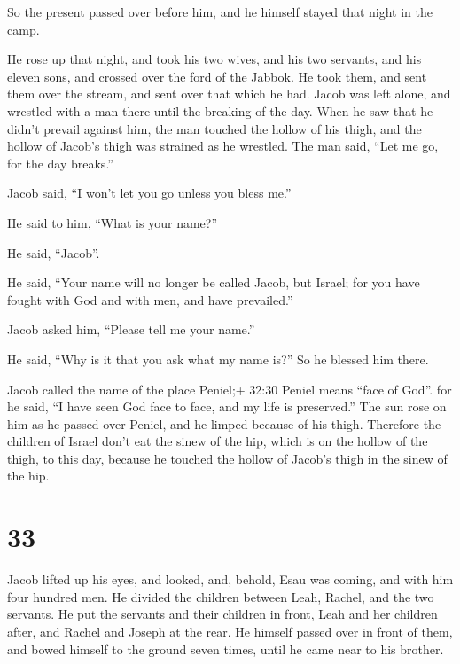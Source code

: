  So the present passed over before him, and he himself
stayed that night in the camp.

 He rose up that night, and took his two wives, and his two
servants, and his eleven sons, and crossed over the ford of the Jabbok.
 He took them, and sent them over the stream, and sent over
that which he had.  Jacob was left alone, and wrestled with
a man there until the breaking of the day.  When he saw
that he didn't prevail against him, the man touched the hollow of his
thigh, and the hollow of Jacob's thigh was strained as he wrestled.
 The man said, ``Let me go, for the day breaks.''

Jacob said, ``I won't let you go unless you bless me.''

 He said to him, ``What is your name?''

He said, ``Jacob''.

 He said, ``Your name will no longer be called Jacob, but
Israel; for you have fought with God and with men, and have prevailed.''

 Jacob asked him, ``Please tell me your name.''

He said, ``Why is it that you ask what my name is?'' So he blessed him
there.

 Jacob called the name of the place Peniel;+ 32:30 Peniel
means ``face of God''. for he said, ``I have seen God face to face, and
my life is preserved.''  The sun rose on him as he passed
over Peniel, and he limped because of his thigh.  Therefore
the children of Israel don't eat the sinew of the hip, which is on the
hollow of the thigh, to this day, because he touched the hollow of
Jacob's thigh in the sinew of the hip.

\hypertarget{section-32}{%
\section{33}\label{section-32}}

 Jacob lifted up his eyes, and looked, and, behold, Esau was
coming, and with him four hundred men. He divided the children between
Leah, Rachel, and the two servants.  He put the servants and
their children in front, Leah and her children after, and Rachel and
Joseph at the rear.  He himself passed over in front of
them, and bowed himself to the ground seven times, until he came near to
his brother.

